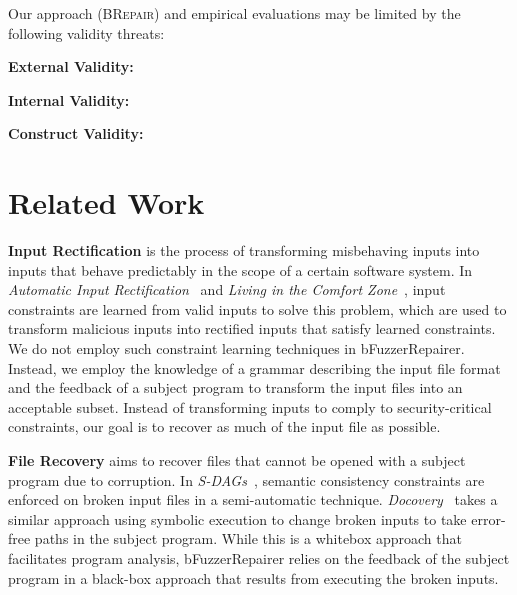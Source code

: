 \documentclass[sigconf,review,anonymous]{acmart}
\newcounter{todocounter}
\newcommand{\todo}[1]{\marginpar{$|$}\textcolor{red}{\stepcounter{todocounter}\footnote[\thetodocounter]{\textcolor{red}{\textbf{TODO }}\textit{#1}}}}
\renewcommand{\todo}[1]{}
\newcommand{\approach}{\textsc{BRepair}\xspace}
\def\bfr{bFuzzerRepairer\xspace}
\begin{document}
\todo{discuss threats to validity .... discuss issues like input synthesis (insertion), requires rich feedback: incorrect and incomplete input fragment}
Our approach (\approach) and empirical evaluations may be limited by the following validity threats:

\noindent
\textbf{External Validity:}

\noindent
\textbf{Internal Validity:}


\noindent
\textbf{Construct Validity:}


\section{Related Work}
\label{sec:related_work}

\todo{refactor this section, looks to similar to ddmax, also add Infix paper ... }


\noindent
\textbf{Input Rectification} is the process of transforming misbehaving inputs into inputs that behave predictably in the scope of a certain software system.
    In \textit{Automatic Input Rectification}~\cite{Long:2012:AIR:2337223.2337233} and \emph{Living in the Comfort Zone}~\cite{Rinard:2007:LCZ:1297027.1297072}, input constraints are learned from valid inputs to solve this problem, which are used to transform malicious inputs into rectified inputs that satisfy learned constraints.
    We do not employ such constraint learning techniques in \bfr.
    Instead, we employ the knowledge of a grammar describing the input file format and the feedback of a subject program to transform the input files into an acceptable subset.
    Instead of transforming inputs to comply to security-critical constraints, our goal is to recover as much of the input file as possible.

\noindent
\textbf{File Recovery} aims to recover files that cannot be opened with a subject program due to corruption.
In \emph{S-DAGs}~\cite{scheffczyk2004s}, semantic consistency constraints are enforced on broken input files in a semi-automatic technique.
\emph{Docovery}~\cite{docovery:ase14} takes a similar approach using symbolic execution to change broken inputs to take error-free paths in the subject program.
While this is a whitebox approach that facilitates program analysis, \bfr relies on the feedback of the subject program in a black-box approach that results from executing the broken inputs.
\end{document}
